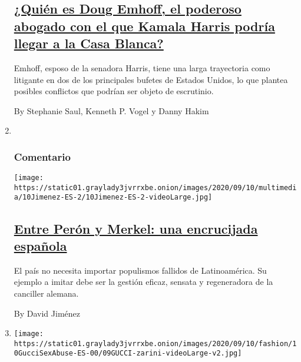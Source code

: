 \begin{enumerate}
  \hypertarget{quiuxe9n-es-doug-emhoff-el-poderoso-abogado-con-el-que-kamala-harris-podruxeda-llegar-a-la-casa-blanca}{%
  \subsection{\texorpdfstring{\href{/es/2020/09/11/espanol/doug-emhoff-esposo-kamala-harris.html}{¿Quién
  es Doug Emhoff, el poderoso abogado con el que Kamala Harris podría
  llegar a la Casa
  Blanca?}}{¿Quién es Doug Emhoff, el poderoso abogado con el que Kamala Harris podría llegar a la Casa Blanca?}}\label{quiuxe9n-es-doug-emhoff-el-poderoso-abogado-con-el-que-kamala-harris-podruxeda-llegar-a-la-casa-blanca}}

  Emhoff, esposo de la senadora Harris, tiene una larga trayectoria como
  litigante en dos de los principales bufetes de Estados Unidos, lo que
  plantea posibles conflictos que podrían ser objeto de escrutinio.

  By Stephanie Saul, Kenneth P. Vogel y Danny Hakim
\item ~
  \hypertarget{comentario}{%
  \subsubsection{Comentario}\label{comentario}}

  \texttt{[image: https://static01.graylady3jvrrxbe.onion/images/2020/09/10/multimedia/10Jimenez-ES-2/10Jimenez-ES-2-videoLarge.jpg]}

  \hypertarget{entre-peruxf3n-y-merkel-una-encrucijada-espauxf1ola}{%
  \subsection{\texorpdfstring{\href{/es/2020/09/10/espanol/opinion/pablo-iglesias-irene-montero.html}{Entre
  Perón y Merkel: una encrucijada
  española}}{Entre Perón y Merkel: una encrucijada española}}\label{entre-peruxf3n-y-merkel-una-encrucijada-espauxf1ola}}

  El país no necesita importar populismos fallidos de Latinoamérica. Su
  ejemplo a imitar debe ser la gestión eficaz, sensata y regeneradora de
  la canciller alemana.

  By David Jiménez
\item
  \texttt{[image: https://static01.graylady3jvrrxbe.onion/images/2020/09/10/fashion/10GucciSexAbuse-ES-00/09GUCCI-zarini-videoLarge-v2.jpg]}

  \hypertarget{el-nuevo-escuxe1ndalo-de-gucci-una-heredera-denuncia-haber-sufrido-abuso-sexual-infantil}{%
}
\end{enumerate}
